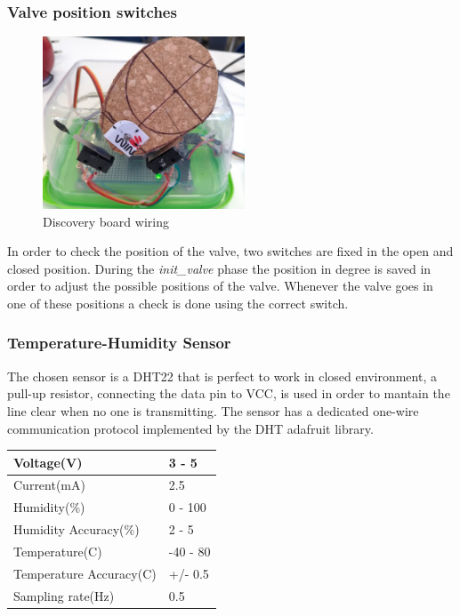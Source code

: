 \subsubsection{Valve position switches}
\begin{figure}[h]
	\centering
	\includegraphics[width=6cm,keepaspectratio]{img/valve}
	\caption{Discovery board wiring}
	\label{fig:valve}
\end{figure}
In order to check the position of the valve, two switches are fixed in the open and closed position.
During the \textit{init\_valve} phase the position in degree is saved in order to adjust the possible positions of the valve.
Whenever the valve goes in one of these positions a check is done using the correct switch.	

\subsubsection{Temperature-Humidity Sensor}
The chosen sensor is a DHT22 that is perfect to work in closed environment, 
a pull-up resistor, connecting the data pin to VCC, is used in order to mantain the line clear when no one is transmitting.
The sensor has a dedicated one-wire communication protocol implemented by the DHT adafruit library.
\begin{center}
	\begin{tabular}{||l | l||} 
		\hline
		Voltage(V) & 3 - 5 \\ 
		\hline
		Current(mA) & 2.5 \\
		\hline
		Humidity(\%) & 0 - 100 \\
		\hline
		Humidity Accuracy(\%) & 2 - 5 \\
		\hline
		Temperature(C\degree) & -40 - 80 \\
		\hline
		Temperature Accuracy(C\degree) & +/- 0.5 \\
		\hline
		Sampling rate(Hz) & 0.5 \\
		\hline
	\end{tabular}
\end{center}


